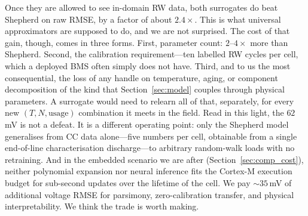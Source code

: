 \documentclass[5p,times,number]{elsarticle}
\newcommand{\secref}[1]{\hyperref[#1]{\textup{Section~\ref*{#1}}}}
\def\secref#1{Section~\ref{#1}}
\begin{document}
Once they are allowed to see in-domain RW data, both surrogates do beat Shepherd on raw RMSE, by a factor of about $2.4\times$. This is what universal approximators are supposed to do, and we are not surprised. The cost of that gain, though, comes in three forms. First, parameter count: $2$--$4\times$ more than Shepherd. Second, the calibration requirement---ten labelled RW cycles per cell, which a deployed BMS often simply does not have. Third, and to us the most consequential, the loss of any handle on temperature, aging, or component decomposition of the kind that \secref{sec:model} couples through physical parameters. A surrogate would need to relearn all of that, separately, for every new $(T, N, \text{usage})$ combination it meets in the field. Read in this light, the $62$\,mV is not a defeat. It is a different operating point: only the Shepherd model generalises from CC data alone---five numbers per cell, obtainable from a single end-of-line characterisation discharge---to arbitrary random-walk loads with no retraining. And in the embedded scenario we are after (\secref{sec:comp_cost}), neither polynomial expansion nor neural inference fits the Cortex-M execution budget for sub-second updates over the lifetime of the cell. We pay $\sim\!35$\,mV of additional voltage RMSE for parsimony, zero-calibration transfer, and physical interpretability. We think the trade is worth making.
\end{document}
